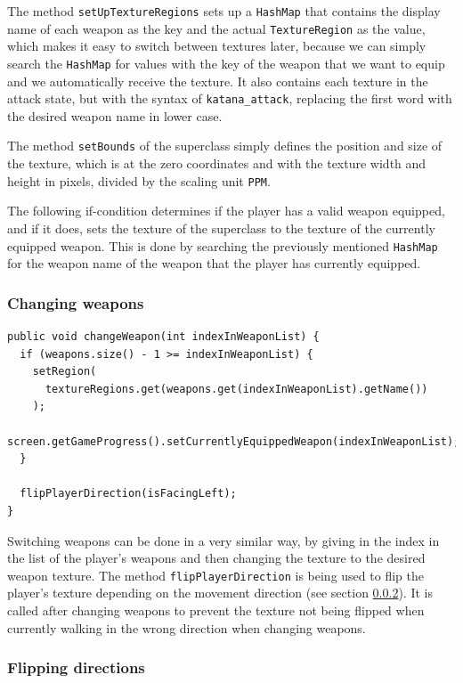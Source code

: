 \documentclass[12p]{article}
\begin{document}
The method \texttt{setUpTextureRegions} sets up a \texttt{HashMap} that contains the display name of each weapon as the key and the actual \texttt{TextureRegion} as the value, which makes it easy to switch between textures later, because we can simply search the \texttt{HashMap} for values with the key of the weapon that we want to equip and we automatically receive the texture. It also contains each texture in the attack state, but with the syntax of \texttt{katana\_attack}, replacing the first word with the desired weapon name in lower case.

The method \texttt{setBounds} of the superclass simply defines the position and size of the texture, which is at the zero coordinates and with the texture width and height in pixels, divided by the scaling unit \texttt{PPM}.

The following if-condition determines if the player has a valid weapon equipped, and if it does, sets the texture of the superclass to the texture of the currently equipped weapon. This is done by searching the previously mentioned \texttt{HashMap} for the weapon name of the weapon that the player has currently equipped.

\subsubsection{Changing weapons}

\begin{verbatim}
public void changeWeapon(int indexInWeaponList) {
  if (weapons.size() - 1 >= indexInWeaponList) {
    setRegion(
      textureRegions.get(weapons.get(indexInWeaponList).getName())
    );
    screen.getGameProgress().setCurrentlyEquippedWeapon(indexInWeaponList);
  }

  flipPlayerDirection(isFacingLeft);
}
\end{verbatim}

Switching weapons can be done in a very similar way, by giving in the index in the list of the player's weapons and then changing the texture to the desired weapon texture. The method \texttt{flipPlayerDirection} is being used to flip the player's texture depending on the movement direction (see section \ref{DocPlayerFlipping}). It is called after changing weapons to prevent the texture not being flipped when currently walking in the wrong direction when changing weapons.

\newpage
\subsubsection{Flipping directions} \label{DocPlayerFlipping}
\end{document}
